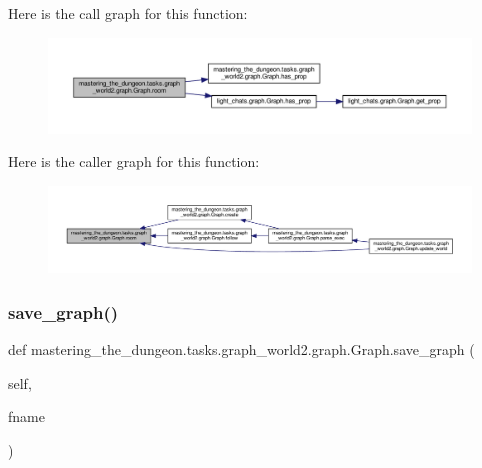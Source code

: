 Here is the call graph for this function\+:
\nopagebreak
\begin{figure}[H]
\begin{center}
\leavevmode
\includegraphics[width=350pt]{classmastering__the__dungeon_1_1tasks_1_1graph__world2_1_1graph_1_1Graph_aaa7e8c07a96b32ac6cfa2f06b5f1772a_cgraph}
\end{center}
\end{figure}
Here is the caller graph for this function\+:
\nopagebreak
\begin{figure}[H]
\begin{center}
\leavevmode
\includegraphics[width=350pt]{classmastering__the__dungeon_1_1tasks_1_1graph__world2_1_1graph_1_1Graph_aaa7e8c07a96b32ac6cfa2f06b5f1772a_icgraph}
\end{center}
\end{figure}
\mbox{\label{classmastering__the__dungeon_1_1tasks_1_1graph__world2_1_1graph_1_1Graph_aa8ab08acb55e401a9e8f0deb501640bc}} 
\subsubsection{\texorpdfstring{save\+\_\+graph()}{save\_graph()}}
{\footnotesize\ttfamily def mastering\+\_\+the\+\_\+dungeon.\+tasks.\+graph\+\_\+world2.\+graph.\+Graph.\+save\+\_\+graph (\begin{DoxyParamCaption}\item[{}]{self,  }\item[{}]{fname }\end{DoxyParamCaption})}



